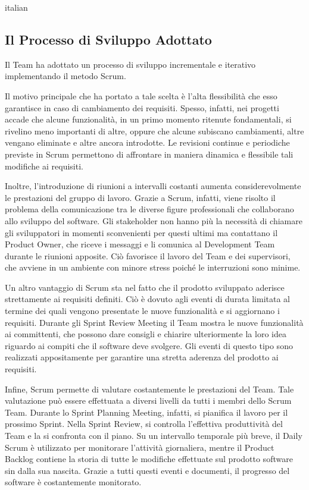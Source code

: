 \begin{otherlanguage*}{italian}
			

		\subsection*{Il Processo di Sviluppo Adottato}
			Il Team ha adottato un processo di sviluppo incrementale e iterativo implementando il metodo Scrum.

			Il motivo principale che ha portato a tale scelta è l'alta flessibilità che esso garantisce in caso di cambiamento dei requisiti.
			Spesso, infatti, nei progetti accade che alcune funzionalità, in un primo momento ritenute fondamentali, si rivelino meno importanti di altre, oppure che alcune subiscano cambiamenti, altre vengano eliminate e altre ancora introdotte.
			Le revisioni continue e periodiche previste in Scrum permettono di affrontare in maniera dinamica e flessibile tali modifiche ai requisiti.
	
			Inoltre, l'introduzione di riunioni a intervalli costanti aumenta considerevolmente le prestazioni del gruppo di lavoro.
			Grazie a Scrum, infatti, viene risolto il problema della comunicazione tra le diverse figure professionali che collaborano allo sviluppo del software.  
			Gli stakeholder non hanno più la necessità di chiamare gli sviluppatori in momenti sconvenienti per questi ultimi ma contattano il Product Owner, che riceve i messaggi e li comunica al Development Team durante le riunioni apposite.
			Ciò favorisce il lavoro del Team e dei supervisori, che avviene in un ambiente con minore stress poiché le interruzioni sono minime.

			Un altro vantaggio di Scrum sta nel fatto che il prodotto sviluppato aderisce strettamente ai requisiti definiti.
			Ciò è dovuto agli eventi di durata limitata al termine dei quali vengono presentate le nuove funzionalità e si aggiornano i requisiti.
			Durante gli Sprint Review Meeting il Team mostra le nuove funzionalità ai committenti, che possono dare consigli e chiarire ulteriormente la loro idea riguardo ai compiti che il software deve svolgere.
			Gli eventi di questo tipo sono realizzati appositamente per garantire una stretta aderenza del prodotto ai requisiti.

			Infine, Scrum permette di valutare costantemente le prestazioni del Team.
			Tale valutazione può essere effettuata a diversi livelli da tutti i membri dello Scrum Team.
			Durante lo Sprint Planning Meeting, infatti, si pianifica il lavoro per il prossimo Sprint.
			Nella Sprint Review, si controlla l'effettiva produttività del Team e la si confronta con il piano.
			Su un intervallo temporale più breve, il Daily Scrum è utilizzato per monitorare l'attività giornaliera, mentre il Product Backlog contiene la storia di tutte le modifiche effettuate sul prodotto software sin dalla sua nascita. 
			Grazie a tutti questi eventi e documenti, il progresso del software è costantemente monitorato. 
			

\end{otherlanguage*}
